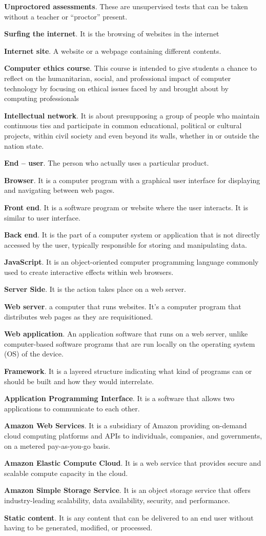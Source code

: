 \textbf{Unproctored assessments}.
These are unsupervised tests that can be taken without a teacher or “proctor” present.

\textbf{Surfing the internet}.
It is the browsing of websites in the internet

\textbf{Internet site}.
A website or a webpage containing different contents.

\textbf{Computer ethics course}.
This course is intended to give students a chance to reflect on the humanitarian, social, and professional impact of computer technology by focusing on ethical issues faced by and brought about by computing professionals

\textbf{Intellectual network}.
It is about presupposing a group of people who maintain continuous ties and participate in common educational, political or cultural projects, within civil society and even beyond its walls, whether in or outside the nation state.

\textbf{End – user}.
The person who actually uses a particular product.

\textbf{Browser}.
It is a computer program with a graphical user interface for displaying and navigating between web pages.

\textbf{Front end}.
It is a software program or website where the user interacts. It is similar to user interface.

\textbf{Back end}.
It is the part of a computer system or application that is not directly accessed by the user, typically responsible for storing and manipulating data.

\textbf{JavaScript}.
It is an object-oriented computer programming language commonly used to create interactive effects within web browsers.

\textbf{Server Side}.
It is the action takes place on a web server.

\textbf{Web server}.
a computer that runs websites. It's a computer program that distributes web pages as they are requisitioned.

\textbf{Web application}.
An application software that runs on a web server, unlike computer-based software programs that are run locally on the operating system (OS) of the device.

\textbf{Framework}.
It is a layered structure indicating what kind of programs can or should be built and how they would interrelate.

\textbf{Application Programming Interface}.
It is a software that allows two applications to communicate to each other.

\textbf{Amazon Web Services}.
It is a subsidiary of Amazon providing on-demand cloud computing platforms and APIs to individuals, companies, and governments, on a metered pay-as-you-go basis.

\textbf{Amazon Elastic Compute Cloud}.
It is a web service that provides secure and scalable compute capacity in the cloud.

\textbf{Amazon Simple Storage Service}.
It is an object storage service that offers industry-leading scalability, data availability, security, and performance.

\textbf{Static content}.
It is any content that can be delivered to an end user without having to be generated, modified, or processed.
